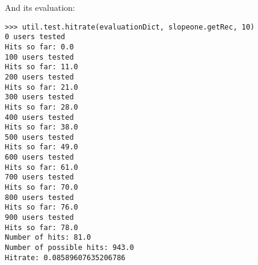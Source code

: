 And its evaluation:
\begin{lstlisting}[style=python]
>>> util.test.hitrate(evaluationDict, slopeone.getRec, 10)
0 users tested
Hits so far: 0.0
100 users tested
Hits so far: 11.0
200 users tested
Hits so far: 21.0
300 users tested
Hits so far: 28.0
400 users tested
Hits so far: 38.0
500 users tested
Hits so far: 49.0
600 users tested
Hits so far: 61.0
700 users tested
Hits so far: 70.0
800 users tested
Hits so far: 76.0
900 users tested
Hits so far: 78.0
Number of hits: 81.0
Number of possible hits: 943.0
Hitrate: 0.08589607635206786
\end{lstlisting}
